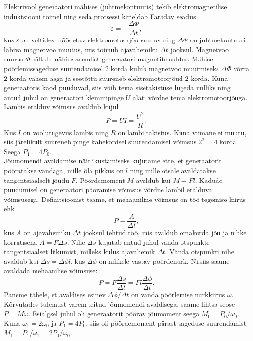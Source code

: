 {\ifSolution
\osa Elektrivool generaatori mähises (juhtmekontuuris) tekib elektromagnetilise induktsiooni toimel ning seda protsessi kirjeldab Faraday seadus
$$
\varepsilon = -\frac{\Delta\Phi}{\Delta t},
$$
kus $\varepsilon$ on voltides mõõdetav elektromotoorjõu suurus ning $\Delta\Phi$ on juhtmekontuuri läbiva magnetvoo muutus, mis toimub ajavahemiku $\Delta t$ jooksul. Magnetvoo suurus $\Phi$ sõltub mähise asendist generaatori magnetite suhtes. Mähise pöörlemissageduse suurendamisel 2 korda kulub magnetvoo muutmiseks $\Delta\Phi$ võrra 2 korda vähem aega  ja seetõttu suureneb elektromotoorjõud 2 korda. Kuna generaatoris kaod puuduvad, siis võib tema sisetakistuse lugeda nulliks ning antud juhul on generaatori klemmipinge $U$ alati võrdne tema elektromotoorjõuga. Lambis eralduv võimsus avaldub kujul
$$
P = UI = \frac{U^2}{R},
$$
Kus $I$ on voolutugevus lambis ning $R$ on lambi takistus. Kuna viimane ei muutu, siis järelikult suureneb pinge kahekordsel suurendamisel võimsus $2^2=4$ korda. Seega $P_1=4P_0$.\\
\osa Jõumomendi avaldamise näitlikustamiseks kujutame ette, et generaatorit pööratakse vändaga, mille õla pikkus on $l$ ning mille otsale avaldatakse tangentsiaalselt jõudu $F$. Pöördemoment $M$ avaldub kui $M=Fl$. Kadude puudumisel on generaatori pööramise võimsus võrdne lambil eralduva võimsusega. Definitsioonist teame, et mehaaniline võimsus on töö tegemise kiirus ehk
$$
P = \frac{A}{\Delta t},
$$
kus $A$ on ajavahemiku $\Delta t$ jooksul tehtud töö, mis avaldub omakorda jõu ja nihke korrutisena $A=F \Delta s$. Nihe $\Delta s$ kujutab antud juhul vända otspunkti tangentsiaalset liikumist, milleks kulus ajavahemik $\Delta t$. Vända otspunkti nihe avaldub kui $\Delta s=\Delta\phi l$, kus $\Delta\phi$ on nihkele vastav pöördenurk. Niisiis saame avaldada mehaanilise võimsuse:
$$
P = F \frac{\Delta s}{\Delta t} =Fl \frac{\Delta\phi}{\Delta t}.
$$
Paneme tähele, et avaldises esinev $\Delta\phi / \Delta t$ on vända pöörlemise nurkkiirus $\omega$. Kõrvutades tulemust varem leitud jõumomendi avaldisega, saame lihtsa seose $P=M\omega$. Esialgsel juhul oli generaatorit pöörav jõumoment seega
$M_0 = P_0/\omega_0$. Kuna $\omega_1=2\omega_0$ ja $P_1=4P_0$, siis oli pöördemoment pärast sageduse suurendamist $M_1 = P_1/\omega_1=2P_0/\omega_0$.
\fi


}
